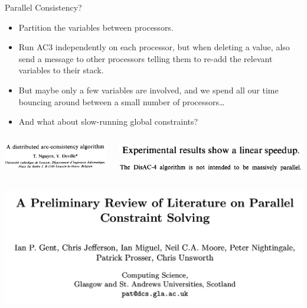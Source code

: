 \documentclass{beamer}
\begin{document}
\begin{frame}{Parallel Consistency?}

     {
        \begin{itemize}
            \item Partition the variables between processors.
            \item Run AC3 independently on each processor, but when deleting a value, also send a
                message to other processors telling them to re-add the relevant variables to their
                stack.
            \item But maybe only a few variables are involved, and we spend all our time
                bouncing around between a small number of processors\ldots
            \item And what about slow-running global constraints?
        \end{itemize}
    }

     {
        \begin{columns}[T]
            \centering\includegraphics[keepaspectratio=true,scale=0.12]{disac4-paper.png}

            \centering\includegraphics[keepaspectratio=true,scale=0.12]{disac4-linear.png}
            \vspace{0.5em}
            \centering\includegraphics[keepaspectratio=true,scale=0.12]{disac4-massive.png}
        \end{columns}

        \vspace{3em}

        \begin{columns}[T]
            \centering\includegraphics[keepaspectratio=true,scale=0.12]{parallel-consistency-paper.png}


\end{columns}}
\end{frame}
\end{document}
